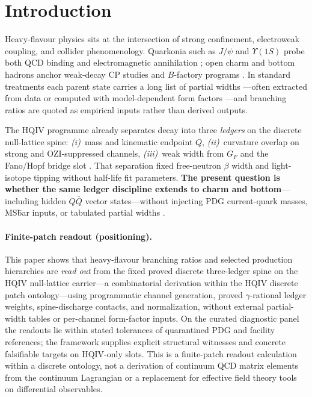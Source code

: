 \documentclass[11pt]{amsart}
\begin{document}
\section{Introduction}
\label{sec:introduction}

Heavy-flavour physics sits at the intersection of strong confinement, electroweak
coupling, and collider phenomenology.
Quarkonia such as $J/\psi$ and $\Upsilon(1S)$ probe both QCD binding and
electromagnetic annihilation \cite{pdg2024,peskin1995,schwartz2014,augustin1974,herb1977};
open charm and bottom hadrons anchor weak-decay CP studies and $B$-factory
programs \cite{pdg2024,kobayashi1973,belle2002}.
In standard treatments each parent state carries a long list of partial widths
---often extracted from data or computed with model-dependent form factors
\cite{pdg2024,peskin1995,schwartz2014}---and
branching ratios are quoted as empirical inputs rather than derived outputs.

The HQIV programme already separates decay into three \emph{ledgers} on the
discrete null-lattice spine: \emph{(i)}~mass and kinematic endpoint $Q$,
\emph{(ii)}~curvature overlap on strong and OZI-suppressed channels,
\emph{(iii)}~weak width from $G_F$ and the Fano/Hopf bridge slot
\cite{hqiv-nucleon-binding-paper,hqiv-tuft-sm-lagrangian-paper}.
That separation fixed free-neutron $\beta$ width and light-isotope tipping
without half-life fit parameters.
\textbf{The present question is whether the same ledger discipline extends to
charm and bottom}---including hidden $Q\bar Q$ vector states---without
injecting PDG current-quark masses, MS\=bar inputs, or tabulated partial widths
\cite{pdg2024}.

\paragraph{Finite-patch readout (positioning).}
This paper shows that heavy-flavour branching ratios and selected production
hierarchies are \emph{read out} from the fixed proved discrete three-ledger spine
on the HQIV null-lattice carrier---a combinatorial derivation within the HQIV
discrete patch ontology---using programmatic channel generation, proved
$\gamma$-rational ledger weights, spine-discharge contacts, and normalization,
without external partial-width tables or per-channel form-factor inputs.
On the curated diagnostic panel the readouts lie within stated tolerances of
quarantined PDG and facility references; the framework supplies explicit
structural witnesses and concrete falsifiable targets on HQIV-only slots.
This is a finite-patch readout calculation within a discrete ontology, not a
derivation of continuum QCD matrix elements from the continuum Lagrangian or a
replacement for effective field theory tools on differential observables.
\end{document}
